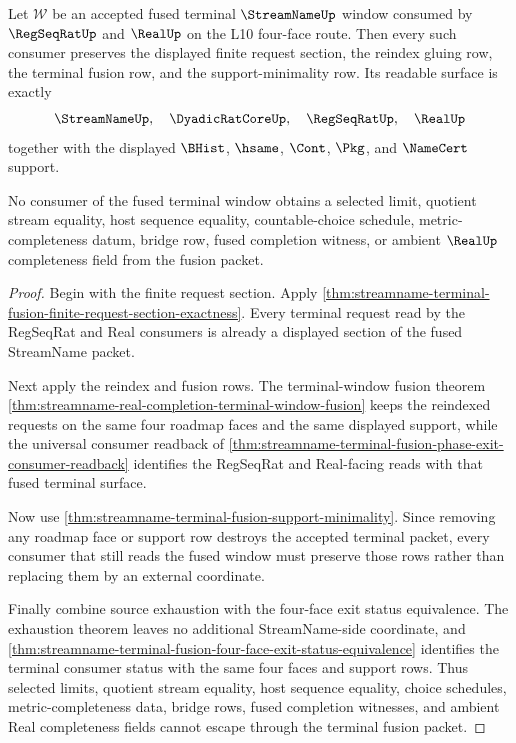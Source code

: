 \begin{theorem}
\label{thm:streamname-terminal-window-fusion-nonescape}
Let $\mathcal W$ be an accepted fused terminal $\StreamNameUp$ window consumed
by $\RegSeqRatUp$ and $\RealUp$ on the L10 four-face route. Then every such
consumer preserves the displayed finite request section, the reindex gluing
row, the terminal fusion row, and the support-minimality row. Its readable
surface is exactly
$$
\StreamNameUp,\quad \DyadicRatCoreUp,\quad \RegSeqRatUp,\quad \RealUp
$$
together with the displayed $\BHist$, $\hsame$, $\Cont$, $\Pkg$, and
$\NameCert$ support.

No consumer of the fused terminal window obtains a selected limit, quotient
stream equality, host sequence equality, countable-choice schedule,
metric-completeness datum, bridge row, fused completion witness, or ambient
$\RealUp$ completeness field from the fusion packet.
\end{theorem}
\begin{proof}
Begin with the finite request section. Apply
\autoref{thm:streamname-terminal-fusion-finite-request-section-exactness}.
Every terminal request read by the RegSeqRat and Real consumers is already a
displayed section of the fused StreamName packet.

Next apply the reindex and fusion rows. The terminal-window fusion theorem
\autoref{thm:streamname-real-completion-terminal-window-fusion} keeps the
reindexed requests on the same four roadmap faces and the same displayed
support, while the universal consumer readback of
\autoref{thm:streamname-terminal-fusion-phase-exit-consumer-readback}
identifies the RegSeqRat and Real-facing reads with that fused terminal
surface.

Now use \autoref{thm:streamname-terminal-fusion-support-minimality}. Since
removing any roadmap face or support row destroys the accepted terminal
packet, every consumer that still reads the fused window must preserve those
rows rather than replacing them by an external coordinate.

Finally combine source exhaustion with the four-face exit status equivalence.
The exhaustion theorem leaves no additional StreamName-side coordinate, and
\autoref{thm:streamname-terminal-fusion-four-face-exit-status-equivalence}
identifies the terminal consumer status with the same four faces and support
rows. Thus selected limits, quotient stream equality, host sequence equality,
choice schedules, metric-completeness data, bridge rows, fused completion
witnesses, and ambient Real completeness fields cannot escape through the
terminal fusion packet.
\end{proof}
